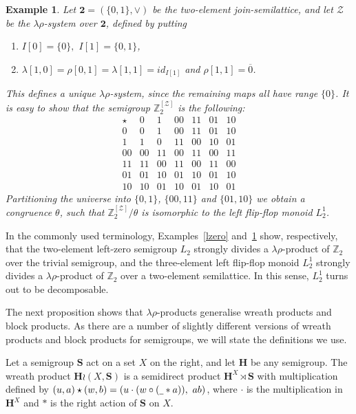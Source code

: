 \documentclass{amsart}
\newtheorem{example}{Example}
\newcommand{\bl}{\underline{\hspace{1ex}}}
\begin{document}
\begin{example}\label{flip-flop}
Let $\mathbf{2}=(\{0,1\},\vee)$ be the two-element join-semilattice, and let
$\mathcal{Z}$ be the $\lambda\rho$-system over $\mathbf{2}$, defined by putting
\begin{enumerate}
\item $I[0]=\{0\},$ $I[1]=\{0,1\}$,
\item $\lambda[1,0]=\rho[0,1]=\lambda[1,1]=id_{I[1]}$ and
  $\rho[1,1] = \overline{0}$. 
\end{enumerate}
This defines a unique $\lambda\rho$-system, since 
the remaining maps all have range $\{0\}$. It is
easy to show that the semigroup $\mathbb Z_2^{[\mathcal{Z}]}$ is the following:
$$
\begin{array}{c|cccccc}
\star &0&1&00&11&01&10\\
\hline
0&0&1&00&11&01&10\\
1&1&0&11&00&10&01\\
00&00&11&00&11&00&11\\
11&11&00&11&00&11&00\\
01&01&10&01&10&01&10\\
10&10&01&10&01&10&01
\end{array}
$$
Partitioning the universe into $\{0,1\}$, $\{00,11\}$ and $\{01,10\}$
we obtain a congruence $\theta$, such that $\mathbb Z_2^{[\mathcal{Z}]}/\theta$ is
isomorphic to the left flip-flop monoid $L_2^1$. 
\end{example}

In the commonly used terminology, Examples~\ref{lzero} and~\ref{flip-flop} show,
respectively, that the two-element left-zero semigroup $L_2$ strongly divides
a $\lambda\rho$-product of $\mathbb{Z}_2$ over the trivial semigroup, and
the three-element left flip-flop monoid $L_2^1$ strongly divides 
a $\lambda\rho$-product of $\mathbb{Z}_2$ over a two-element semilattice.
In this sense, $L_2^1$ turns out to be decomposable.


The next proposition shows that $\lambda\rho$-products generalise
wreath products and block products. As there
are a number of slightly different versions of wreath products and block
products for semigroups, we will state the definitions we use.

Let a semigroup $\mathbf{S}$ act on a set $X$ on the right, and let $\mathbf{H}$
be any semigroup. The wreath product $\mathbf{H}\wr (X,\mathbf{S})$ is
a semidirect product $\mathbf{H}^X\rtimes  \mathbf{S}$ with multiplication
defined by $(u, a)\star(w,b) = (u\cdot (w\circ(\bl \ast a)),\ ab)$, where
$\cdot$ is the multiplication in $\mathbf{H}^X$ and $\ast$ is the right action
of $\mathbf{S}$ on $X$.
\end{document}

